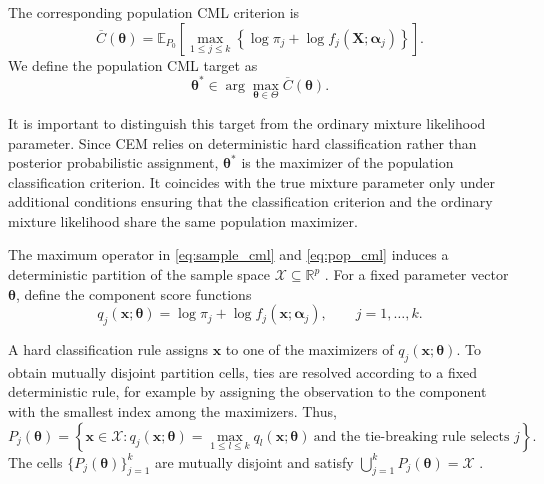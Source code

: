 \documentclass[pdflatex,sn-mathphys-ay]{sn-jnl}%
\let\oldtheta\theta
\renewcommand{\theta}{\boldsymbol{\oldtheta}}
\let\oldalpha\alpha
\renewcommand{\alpha}{\boldsymbol{\oldalpha}}
\theoremstyle{thmstyleone}%
\theoremstyle{thmstyletwo}%
\theoremstyle{thmstylethree}%
\begin{document}
The corresponding population CML criterion is
\begin{equation}
    \overline{C}(\boldsymbol{\theta})
    =
    \mathbb{E}_{P_0}
    \left[
        \max_{1\leq j\leq k}
        \left\{
            \log \pi_j
            +
            \log f_j(\mathbf{X};\boldsymbol{\alpha}_j)
        \right\}
    \right].
    \label{eq:pop_cml}
\end{equation}
We define the population CML target as
\begin{equation}
    \boldsymbol{\theta}^*
    \in
    \arg\max_{\boldsymbol{\theta}\in\Theta}
    \overline{C}(\boldsymbol{\theta}).
    \label{eq:population_target}
\end{equation}

It is important to distinguish this target from the ordinary mixture likelihood parameter. Since CEM relies on deterministic hard classification rather than posterior probabilistic assignment, $\boldsymbol{\theta}^*$ is the maximizer of the population classification criterion. It coincides with the true mixture parameter only under additional conditions ensuring that the classification criterion and the ordinary mixture likelihood share the same population maximizer.

The maximum operator in \eqref{eq:sample_cml} and \eqref{eq:pop_cml} induces a deterministic partition of the sample space $\mathcal{X} \subseteq \mathbb{R}^p$ . For a fixed parameter vector $\boldsymbol{\theta}$, define the component score functions
\begin{equation}
    q_j(\mathbf{x};\boldsymbol{\theta})
    =
    \log \pi_j
    +
    \log f_j(\mathbf{x};\boldsymbol{\alpha}_j),
    \qquad
    j=1,\ldots,k.
    \label{eq:component_score}
\end{equation}

A hard classification rule assigns $\mathbf{x}$ to one of the maximizers of $q_j(\mathbf{x};\boldsymbol{\theta})$. To obtain mutually disjoint partition cells, ties are resolved according to a fixed deterministic rule, for example by assigning the observation to the component with the smallest index among the maximizers. Thus,
\begin{equation}
    P_j(\boldsymbol{\theta})
    =
    \left\{
    \mathbf{x}\in\mathcal{X}:
    q_j(\mathbf{x};\boldsymbol{\theta})
    =
    \max_{1\leq l\leq k}
    q_l(\mathbf{x};\boldsymbol{\theta})
    \ \text{and the tie-breaking rule selects } j
    \right\}.
    \label{eq:partition_cells}
\end{equation}
The cells
    $\{
    P_j(\boldsymbol{\theta})
    \}_{j=1}^k$
are mutually disjoint and satisfy
   $ \bigcup_{j=1}^k
    P_j(\boldsymbol{\theta})
    =
    \mathcal{X}$ .
\end{document}
